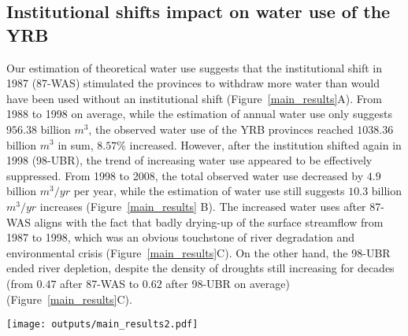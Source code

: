 
\subsection{Institutional shifts impact on water use of the YRB}
\label{result-2}

\label{result-1-p2}
Our estimation of theoretical water use suggests that the institutional shift in 1987 (87-WAS) stimulated the provinces to withdraw more water than would have been used without an institutional shift (Figure~\ref{main_results}A).
From 1988 to 1998 on average, while the estimation of annual water use only suggests $956.38$ billion $m^3$, the observed water use of the YRB provinces reached $1038.36$ billion $m^3$ in sum, $8.57\%$ increased.
However, after the institution shifted again in 1998 (98-UBR), the trend of increasing water use appeared to be effectively suppressed. From 1998 to 2008, the total observed water use decreased by $4.9$ billion $m^3/yr$ per year, while the estimation of water use still suggests $10.3$ billion $m^3/yr$ increases (Figure~\ref{main_results} B).
The increased water uses after 87-WAS aligns with the fact that badly drying-up of the surface streamflow from 1987 to 1998, which was an obvious touchstone of river degradation and environmental crisis (Figure~\ref{main_results}C).
On the other hand, the 98-UBR ended river depletion, despite the density of droughts still increasing for decades (from $0.47$ after 87-WAS to $0.62$ after 98-UBR on average) (Figure~\ref{main_results}C).

\begin{figure*}[!h]
    \centering
    \texttt{[image: outputs/main\_results2.pdf]}
    \caption{
        Effects of two institutional shifts on water resources use and allocation in the Yellow River Basin (YRB).
        \textbf{A.} water uses of the YRB before and after the institutional shift in 1987 (87-WAS);
        \textbf{B.} water uses of the YRB before and after the institutional shift in 1998 (98-UBR). While the blue lines are statistic water use data, the grey ones are the estimation from the Differenced Synthetic Control method with economic and environmental background controlled.
        \textbf{C.} Drought intensity in the YRB and drying up events of the Yellow River. The size of the grey bubbles denotes the length of a drying upstream.
    }
    \label{main_results}
\end{figure*}


